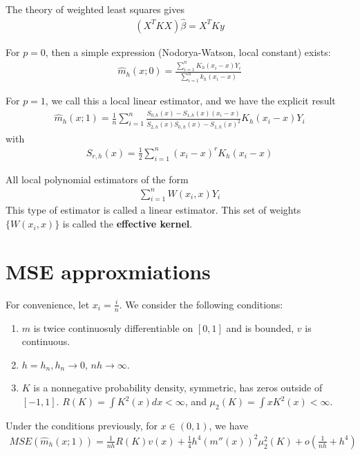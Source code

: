The theory of weighted least squares gives
\begin{align}
  \label{eq:53}
  (X^{T} K X) \hat \beta = X^{T} K y
\end{align}

For $p = 0$, then a simple expression (Nodorya-Watson, local constant)
exists:
\begin{align}
  \label{eq:54}
  \hat m_{h}(x; 0) = \frac{\sum_{i=1}^{n} K_{h}(x_{i} -
    x)Y_{i}}{\sum_{i=1}^{n} k_{h}(x_{i} - x)}
\end{align}


For $p= 1$, we call this a local linear estimator, and we have the
explicit result
\begin{align}
  \label{eq:55}
  \hat m_{h}(x; 1) = \frac{1}{n} \sum_{i=1}^{n} \frac{S_{0, h}(x) -
    S_{1, h}(x)(x_{i} - x)}{S_{2, h}(x) S_{0, h}(x) - S_{1, h}(x)^{2}}
  K_{h}(x_{i} - x) Y_{i}
\end{align}
with
\begin{align}
  \label{eq:56}
  S_{r, h}(x) = \frac{1}{2} \sum_{i=1}^{n} (x_{i} - x)^{r} K_{h}(x_{i}
  - x)
\end{align}

All local polynomial estimators of the form
\begin{align}
  \label{eq:57}
  \sum_{i=1}^{n} W(x_{i}, x) Y_{i}
\end{align}
This type of estimator is called a linear estimator.   This set of
weights $\{ W(x_{i}, x) \}$ is called the \textbf{effective kernel}.

\section{MSE approxmiations}
\label{sec:mse-approxmiations}

For convenience, let $x_{i} = \frac{i}{n}$.  We consider the following
conditions:

\begin{enumerate}
\item $m$ is twice continuosuly differentiable on $[0, 1]$ and is bounded, $v$ is continuous.
\item $h = h_{n}, h_{n} \rightarrow 0$, $nh \rightarrow \infty$.
\item $K$ is a nonnegative probability density, symmetric, has zeros
  outside of $[-1, 1]$. $R(K) = \int K^{2}(x) dx < \infty$, and
  $\mu_{2}(K) = \int x K^{2}(x) < \infty$.
\end{enumerate}

\begin{thm}
  \label{defn:nonparametric_regression:1}
  Under the conditions previously, for $x \in (0, 1)$, we have
  \begin{align}
    \label{eq:58}
    MSE(\hat m_{h}(x; 1)) = \frac{1}{nh} R(K) v(x) + \frac{1}{4} h^{4}
    (m''(x))^{2} \mu_{2}^{2}(K) + o(\frac{1}{nh} + h^{4})
  \end{align}
\end{thm}

